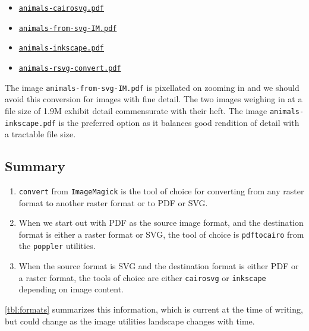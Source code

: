 \documentclass[
  a4paper,
]{article}
\providecommand{\tightlist}{%
  \setlength{\itemsep}{0pt}\setlength{\parskip}{0pt}}
\begin{document}
\begin{itemize}
\tightlist
\item
  \href{images/animals-cairosvg.pdf}{\texttt{animals-cairosvg.pdf}}
\item
  \href{images/animals-from-svg-IM.pdf}{\texttt{animals-from-svg-IM.pdf}}
\item
  \href{images/animals-inkscape.pdf}{\texttt{animals-inkscape.pdf}}
\item
  \href{images/animals-rsvg-convert.pdf}{\texttt{animals-rsvg-convert.pdf}}
\end{itemize}

The image \texttt{animals-from-svg-IM.pdf} is pixellated on zooming in
and we should avoid this conversion for images with fine detail. The two
images weighing in at a file size of 1.9M exhibit detail commensurate
with their heft. The image \texttt{animals-inkscape.pdf} is the
preferred option as it balances good rendition of detail with a
tractable file size.

\hypertarget{summary}{%
\subsection{Summary}\label{summary}}

\begin{enumerate}
\item
  \texttt{convert} from \texttt{ImageMagick} is the tool of choice for
  converting from any raster format to another raster format or to PDF
  or SVG.
\item
  When we start out with PDF as the source image format, and the
  destination format is either a raster format or SVG, the tool of
  choice is \texttt{pdftocairo} from the \texttt{poppler} utilities.
\item
  When the source format is SVG and the destination format is either PDF
  or a raster format, the tools of choice are either \texttt{cairosvg}
  or \texttt{inkscape} depending on image content.
\end{enumerate}

\cref{tbl:formats} summarizes this information, which is current at the
time of writing, but could change as the image utilities landscape
changes with time.
\end{document}

